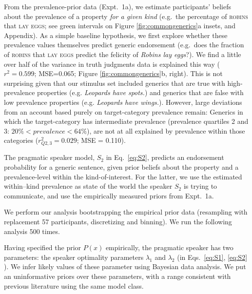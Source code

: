 \documentclass[12pt,letterpaper]{article}
\newcommand{\mht}[1]{\textcolor{Blue}{[mht: #1]}}
\begin{document}
 
 
From the prevalence-prior data (Expt.~1a), we estimate participants' beliefs about the prevalence of a property \emph{for a given kind} (e.g.~the percentage of \textsc{robins} that \textsc{lay eggs}; see green intervals on Figure \ref{fig:commongenerics}a insets, and Appendix).
As a simple baseline hypothesis, we first explore whether these prevalence values themselves predict generic endorsement (e.g.~does the fraction of \textsc{robins} that \textsc{lay eggs} predict the felicity of \emph{Robins lay eggs}?).
We find a little over half of the variance in truth judgments data is explained this way ($r^2 = 0.599$; MSE=0.065; Figure \ref{fig:commongenerics}b, right). 
This is not surprising given that our stimulus set included generics that are true with high-prevalence properties (e.g. \emph{Leopards have spots.}) and  generics that are false with low prevalence properties (e.g. \emph{Leopards have wings.}). 
However, large deviations from an account based purely on target-category prevalence remain: Generics in which the target-category has intermediate prevalence (prevalence quartiles 2 and 3: $ 20\% < prevalence < 64\%$), are not at all explained by prevalence within those categories ($r_{Q2,3}^2 = 0.029$; MSE = 0.110).



The pragmatic speaker model, $S_2$ in Eq.~\ref{eq:S2}, predicts an endorsement probability for a generic sentence, given prior beliefs about the property and a prevalence-level within the kind-of-interest. 
For the latter, we use the estimated within--kind prevalence as state of the world the speaker $S_2$ is trying to communicate, and use the empirically measured priors from Expt.~1a. 


We perform our analysis bootstrapping the empirical prior data (resampling with replacement 57 participants, discretizing and binning). 
We run the following analysis 500 times.

Having specified the prior $P(x)$ empirically, the pragmatic speaker has two parameters: the speaker optimality parameters $\lambda_1$ and $\lambda_2$ (in Eqs.~\ref{eq:S1}, \ref{eq:S2} ).
We infer likely values of these parameter using Bayesian data analysis.
We put an uninformative priors over these parameters, with a range consistent with previous literature using the same model class.
\end{document}
